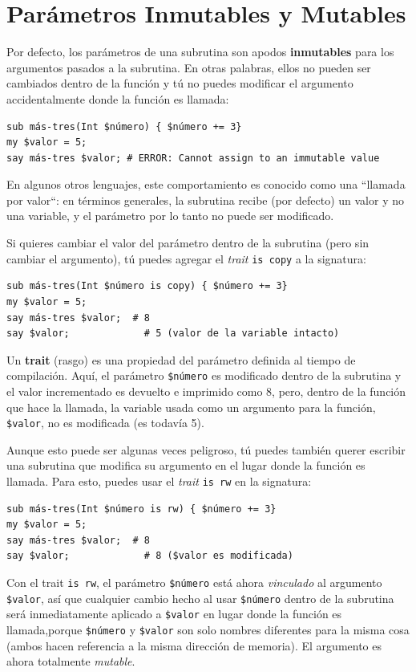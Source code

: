 \section{Parámetros Inmutables y Mutables}

Por defecto, los parámetros de una subrutina son apodos {\bf inmutables}
para los argumentos pasados a la subrutina. En otras palabras,
ellos no pueden ser cambiados dentro de la función y tú no puedes
modificar el argumento accidentalmente donde la función es llamada:

\begin{verbatim}
sub más-tres(Int $número) { $número += 3}
my $valor = 5;
say más-tres $valor; # ERROR: Cannot assign to an immutable value
\end{verbatim}

En algunos otros lenguajes, este comportamiento es conocido
como una ``llamada por valor``: en términos generales, 
la subrutina recibe (por defecto) un valor y no una variable, y 
el parámetro por lo tanto no puede ser modificado.

Si quieres cambiar el valor del parámetro dentro de la subrutina
(pero sin cambiar el argumento), tú puedes agregar el \emph{trait} 
{\tt is copy} a la signatura:

\begin{verbatim}
sub más-tres(Int $número is copy) { $número += 3}
my $valor = 5;
say más-tres $valor;  # 8
say $valor;             # 5 (valor de la variable intacto)
\end{verbatim}
%
Un {\bf trait} (rasgo) es una propiedad del parámetro definida
al tiempo de compilación. Aquí, el parámetro {\tt \$número} es
modificado dentro de la subrutina y el valor incrementado es devuelto e 
imprimido como 8, pero, dentro de la función que hace la llamada,
la variable usada como un argumento para la función, {\tt \$valor},
no es modificada (es todavía 5).

Aunque esto puede ser algunas veces peligroso, tú puedes 
también querer escribir una subrutina que modifica su argumento
en el lugar donde la función es llamada. Para esto, puedes usar
el \emph{trait} {\tt is rw} en la signatura:

\begin{verbatim}
sub más-tres(Int $número is rw) { $número += 3}
my $valor = 5;
say más-tres $valor;  # 8
say $valor;             # 8 ($valor es modificada)
\end{verbatim}
%
Con el trait {\tt is rw}, el parámetro {\tt \$número} está ahora
\emph{vinculado} al argumento {\tt \$valor}, así que cualquier
cambio hecho al usar {\tt \$número} dentro de la subrutina será 
inmediatamente aplicado a {\tt \$valor} en lugar donde la función
es llamada,porque {\tt \$número} y {\tt \$valor} son solo nombres
diferentes para la misma cosa (ambos hacen referencia a la misma
dirección de memoria). El argumento es ahora totalmente \emph{mutable}.

